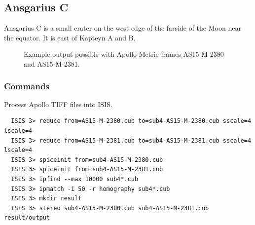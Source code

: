 \subsection{Ansgarius C}

Ansgarius C is a small crater on the west edge of the farside of the
Moon near the equator. It is east of Kapteyn A and B.

\begin{figure}[h!]
\centering
  \hfil
\caption{Example output possible with Apollo Metric frames AS15-M-2380 and AS15-M-2381.}
\label{fig:metric_example}
\end{figure}

\subsubsection*{Commands}

Process Apollo TIFF files into \ac{ISIS}.
\begin{verbatim}
  ISIS 3> reduce from=AS15-M-2380.cub to=sub4-AS15-M-2380.cub sscale=4 lscale=4
  ISIS 3> reduce from=AS15-M-2381.cub to=sub4-AS15-M-2381.cub sscale=4 lscale=4
  ISIS 3> spiceinit from=sub4-AS15-M-2380.cub
  ISIS 3> spiceinit from=sub4-AS15-M-2381.cub
  ISIS 3> ipfind --max 10000 sub4*.cub
  ISIS 3> ipmatch -i 50 -r homography sub4*.cub
  ISIS 3> mkdir result
  ISIS 3> stereo sub4-AS15-M-2380.cub sub4-AS15-M-2381.cub result/output
\end{verbatim}

